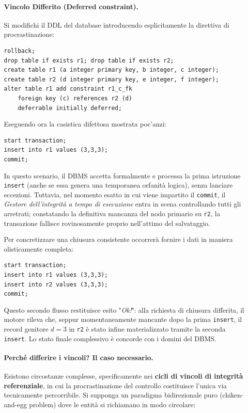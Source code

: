 \paragraph{Vincolo Differito (Deferred constraint).}
Si modifichi il DDL del database introducendo esplicitamente la direttiva di procrastinazione:
\begin{verbatim}
rollback;
drop table if exists r1; drop table if exists r2;
create table r1 (a integer primary key, b integer, c integer);
create table r2 (d integer primary key, e integer, f integer);
alter table r1 add constraint r1_c_fk
    foreign key (c) references r2 (d)
    deferrable initially deferred;
\end{verbatim}
Eseguendo ora la casistica difettosa mostrata poc'anzi:
\begin{verbatim}
start transaction;
insert into r1 values (3,3,3);
commit;
\end{verbatim}
In questo scenario, il DBMS accetta formalmente e processa la prima istruzione \texttt{insert} (anche se essa genera una temporanea orfanità logica), senza lanciare eccezioni. Tuttavia, nel momento esatto in cui viene impartito il \texttt{commit}, il \textit{Gestore dell'integrità a tempo di esecuzione} entra in scena controllando tutti gli arretrati; constatando la definitiva mancanza del nodo primario su \texttt{r2}, la transazione fallisce rovinosamente proprio nell'attimo del salvataggio.

Per concretizzare una chiusura consistente occorrerà fornire i dati in maniera olisticamente completa:
\begin{verbatim}
start transaction;
insert into r1 values (3,3,3);
insert into r2 values (3,3,3);
commit;
\end{verbatim}
Questo secondo flusso restituisce esito "\textit{Ok!}": alla richiesta di chiusura differita, il motore rileva che, seppur momentaneamente mancante dopo la prima \texttt{insert}, il record genitore $d=3$ in \texttt{r2} è stato infine materializzato tramite la seconda \texttt{insert}. Lo stato finale complessivo è concorde con i domini del DBMS.

\paragraph{Perché differire i vincoli? Il caso necessario.}
Esistono circostanze complesse, specificamente nei \textbf{cicli di vincoli di integrità referenziale}, in cui la procrastinazione del controllo costituisce l'unica via tecnicamente percorribile. Si supponga un paradigma bidirezionale puro (chiken-and-egg problem) dove le entità si richiamano in modo circolare:


